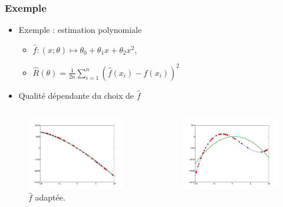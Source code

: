 \documentclass[c]{beamer}
\begin{document}
\begin{frame}
  \frametitle{Exemple}

  \begin{itemize}
    \item Exemple : estimation polynomiale
      \begin{itemize}
        \item $\hat{f} : (x; \theta) \mapsto \theta_0 + \theta_1 x + \theta_2 x^2$,
        \item $\hat{R}(\theta) = \frac{1}{2n} \sum_{i = 1}^n \left( \hat{f}(x_i) - f(x_i) \right)^2$
      \end{itemize}
    \item Qualit\'e d\'ependante du choix de $\hat{f}$
  \end{itemize}
  \begin{columns}
    \begin{column}{.5\textwidth}
      \begin{figure}
        \centering
        \includegraphics[width=.9\textwidth]{regression_good-choice}
        \caption{$\hat{f}$ adapt\'ee.}
      \end{figure}
    \end{column}
    \begin{column}{.5\textwidth}
      \begin{figure}
        \centering
        \includegraphics[width=.9\textwidth]{regression_poor-choice}

\end{figure}
\end{column}
\end{columns}
\end{frame}
\end{document}
